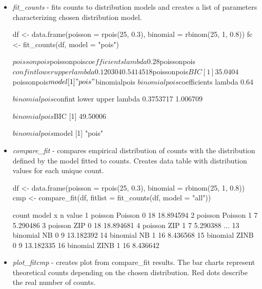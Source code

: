 \begin{itemize}
    \item \textit{fit\_counts} - fits counts to distribution models and creates a list of parameters characterizing chosen distribution model.

{\bfseries
\begin{example}
df <- data.frame(poisson = rpois(25, 0.3), binomial = rbinom(25, 1, 0.8))
fc <- fit_counts(df, model = "pois") 
\end{example}
}

\begin{example}
$poissonpois
$poissonpois$coefficients
lambda 
  0.28 

$poissonpois$confint
          lower     upper
lambda 0.120304 0.5414518

$poissonpois$BIC
[1] 35.0404

$poissonpois$model
[1] "pois"


$binomialpois
$binomialpois$coefficients
lambda 
  0.64 

$binomialpois$confint
           lower    upper
lambda 0.3753717 1.006709

$binomialpois$BIC
[1] 49.50006

$binomialpois$model
[1] "pois"
\end{example}


    \item \textit{compare\_fit} - compares empirical distribution of counts with the distribution defined by the model fitted to counts. Creates data table with distribution values for each unique count.


{\bfseries
\begin{example}
df <- data.frame(poisson = rpois(25, 0.3), binomial = rbinom(25, 1, 0.8))
cmp <- compare_fit(df, fitlist = fit_counts(df, model = "all"))
\end{example}
}

\begin{example}
      count   model x  n     value
1   poisson Poisson 0 18 18.894594
2   poisson Poisson 1  7  5.290486
3   poisson     ZIP 0 18 18.894681
4   poisson     ZIP 1  7  5.290388
...
13 binomial      NB 0  9 13.182392
14 binomial      NB 1 16  8.436568
15 binomial    ZINB 0  9 13.182335
16 binomial    ZINB 1 16  8.436642
\end{example}

    \item \textit{plot\_fitcmp} - creates plot from compare\_fit results. The bar charts represent theoretical counts depending on the chosen distribution. Red dots describe the real number of counts.


\end{itemize}
